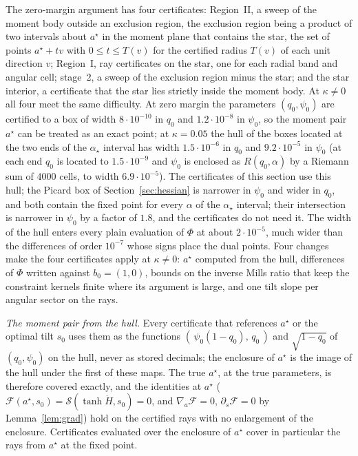 \documentclass[11pt]{article}
\theoremstyle{remark}
\newcommand{\sS}{\mathcal{S}}
\begin{document}
The zero-margin argument has four certificates: Region~II, a sweep of
the moment body outside an exclusion region, the exclusion region
being a product of two intervals about $a^\star$ in the moment plane
that contains the star, the set of points $a^\star+tv$ with
$0\le t\le T(v)$ for the certified radius $T(v)$ of each unit direction
$v$; Region~I, ray certificates on the star, one
for each radial band and angular cell; stage~2, a sweep of the
exclusion region minus the star; and the star interior, a certificate
that the star lies strictly inside the moment body.  At $\kappa\ne0$ all four meet the same difficulty.
At zero margin the parameters $(q_0,\psi_0)$ are certified to a
box of width $8\cdot10^{-10}$ in $q_0$ and $1.2\cdot10^{-8}$ in
$\psi_0$, so the moment pair $a^\star$ can be
treated as an exact point; at
$\kappa=0.05$ the hull of the boxes located at the two ends of the
$\alpha_\star$ interval has width $1.5\cdot10^{-6}$ in $q_0$ and
$9.2\cdot10^{-5}$ in $\psi_0$ (at each end $q_0$ is located to
$1.5\cdot10^{-9}$ and $\psi_0$ is enclosed as $R(q_0,\alpha)$ by a
Riemann sum of $4000$ cells, to width $6.9\cdot10^{-5}$).  The
certificates of this section use this hull; the Picard box of
Section~\ref{sec:hessian} is narrower in $\psi_0$ and wider in $q_0$,
and both contain the fixed point for every $\alpha$ of the
$\alpha_\star$ interval; their intersection is narrower in $\psi_0$ by
a factor of $1.8$, and the certificates do not need it.  The width of the hull enters every plain evaluation of
$\Phi$ at about $2\cdot10^{-5}$, much wider than the differences of
order $10^{-7}$ whose signs place the dual points.  Four changes make the four certificates apply at
$\kappa\ne0$: $a^\star$ computed from the hull, differences of $\Phi$
written against $b_0=(1,0)$, bounds on the inverse Mills ratio that
keep the constraint kernels finite where its argument is large, and one
tilt slope per angular sector on the rays.

\emph{The moment pair from the hull.}  Every certificate that references
$a^\star$ or the optimal tilt $s_0$ uses them as the functions
$(\,\psi_0(1-q_0),\,q_0\,)$ and $\sqrt{1-q_0}$ of $(q_0,\psi_0)$ on the
hull, never as
stored decimals; the enclosure of $a^\star$ is the image of the hull
under the first of these maps.  The true $a^\star$, at the true
parameters, is therefore covered exactly, and the identities at
$a^\star$ ($\mathcal F(a^\star,s_0)=\sS(\tanh\dot H,s_0)=0$, and
$\nabla_a\mathcal F=0$, $\partial_s\mathcal F=0$ by Lemma~\ref{lem:grad}) hold on the certified rays with no enlargement of the
enclosure.  Certificates evaluated over the enclosure of $a^\star$
cover in particular the rays from $a^\star$ at the fixed point.
\end{document}
